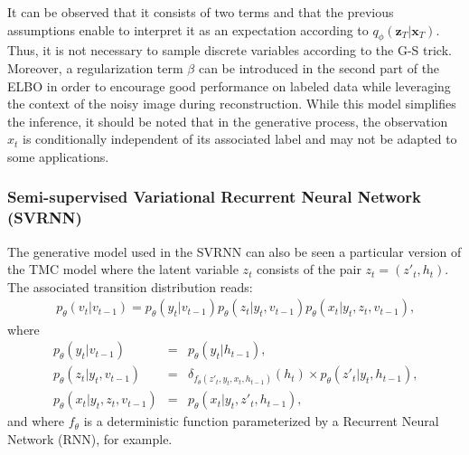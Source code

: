 \documentclass{article}
\def\x{{\mathbf x}}
\def\z{{\mathbf z}}
\def\p{p_{\theta}}
\def\q{q_\phi}
\begin{document}
It can be observed that it consists of two terms and that the previous assumptions enable to 
interpret it as an expectation according to $\q(\z_T|\x_T)$. Thus, it is not necessary to sample discrete variables according to the G-S trick. Moreover, a regularization term $\beta$ can be introduced in the second part of the ELBO in 
order to encourage good performance on labeled data while leveraging the context of the noisy image during reconstruction.
While this model simplifies the inference, it should be noted that in the generative process, the observation $x_t$ is conditionally independent of its associated label and may not
be adapted to some applications.


\subsubsection{ Semi-supervised Variational Recurrent Neural Network (SVRNN)}
\label{sec:svrnn}
The generative model used in the SVRNN can also be seen a particular version of the TMC model where the latent variable
$z_t$ consists of the pair $z_t=(z'_t, h_t)$. The associated
transition distribution reads:
\begin{align}
\label{eq:svrnn}
\!\!\!\!\!\!\! \p(v_t|v_{t-1}\!) \!= \!\p(y_t|v_{t-1}\!) \p(z_t|y_t,\! v_{t-1}\!) \p(x_t|y_t,z_t,\!v_{t-1}\!) \text{,}
\end{align}
where 
\begin{eqnarray*}
\p(y_t|v_{t-1}\!)&=& \p(y_t|h_{t-1})\text{,} \\
\p(z_t|y_t,v_{t-1})&=&\!\delta_{f_{\theta}(z'_t,y_t,x_t,h_{t-1})}(h_t) \!\!\times \!\p(z'_t|y_t, h_{t-1}) \text{,} \\
\p(x_t|y_t,z_t,\!v_{t-1}\!)&=& \p(x_t|y_t, z'_t, h_{t-1}) \text{,}
\end{eqnarray*}
and where $f_{\theta}$ is a deterministic 
function parameterized by a Recurrent Neural Network (RNN), for example.
\end{document}
